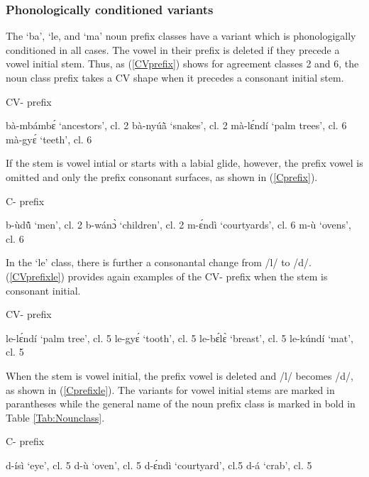 \subsubsection{Phonologically conditioned variants} 

The `ba', `le, and `ma' noun prefix classes have a variant which is phonologigally conditioned in all cases. The vowel in their prefix is deleted if they precede a vowel initial stem. Thus, as (\ref{CVprefix}) shows for agreement classes 2 and 6, the noun class prefix takes a CV shape when it precedes a consonant initial stem.

\begin{exe} 
\ex\label{CVprefix} CV- prefix
\begin{xlist}
\ex bà-mbámbɛ́ `ancestors', cl. 2
\ex bà-nyúã̀ `snakes', cl. 2
\ex mà-lɛ́ndí `palm trees', cl. 6
\ex mà-gyɛ́ `teeth', cl. 6
\end{xlist}
\end{exe}

\noindent If the stem is vowel intial or starts with a labial glide, however, the prefix vowel is omitted and only the prefix consonant surfaces, as shown in (\ref{Cprefix}).

\begin{exe} 
\ex\label{Cprefix} C- prefix
\begin{xlist}
\ex b-ùdũ̂ `men', cl. 2
\ex b-wánɔ̀ `children', cl. 2
\ex m-ɛ́ndì `courtyards', cl. 6
\ex m-ù `ovens', cl. 6
\end{xlist}
\end{exe}


In the `le' class, there is further a consonantal change from /l/ to /d/. (\ref{CVprefixle}) provides again examples of the CV- prefix when the stem is consonant initial.

\begin{exe} 
\ex\label{CVprefixle} CV- prefix
\begin{xlist}
\ex le-lɛ́ndí `palm tree', cl. 5
\ex le-gyɛ́ `tooth', cl. 5
\ex le-bɛ́lɛ̀ `breast', cl. 5
\ex le-kúndí `mat', cl. 5
\end{xlist}
\end{exe}

\noindent When the stem is vowel initial, the prefix vowel is deleted and /l/ becomes /d/, as shown in (\ref{Cprefixle}). The variants for vowel initial stems are marked in parantheses while the general name of the noun prefix class is marked in bold in Table \ref{Tab:Nounclass}. 

\begin{exe} 
\ex\label{Cprefixle} C- prefix
\begin{xlist}
\ex d-ísì `eye', cl. 5
\ex d-ù `oven', cl. 5
\ex d-ɛ́ndì `courtyard', cl.5
\ex d-á `crab', cl. 5
\end{xlist}
\end{exe}

